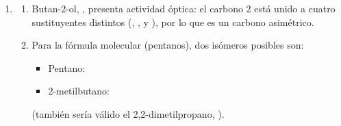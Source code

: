 \begin{exerciseEVAU}
\begin{solu}
\begin{enumerate}[label=\letraminuscula]
            \item
            \begin{enumerate}[label=\letraminuscula]
                \item Butan-2-ol, , presenta actividad óptica: el carbono 2 está unido a cuatro sustituyentes distintos (, ,  y ), por lo que es un carbono asimétrico.

                \item Para la fórmula molecular  (pentanos), dos isómeros posibles son:
                \begin{itemize}
                    \item Pentano: 
                    \item 2-metilbutano: 
                \end{itemize}
                (también sería válido el 2,2-dimetilpropano, ).
            \end{enumerate}
        \end{enumerate}
    \end{solu}
\end{exerciseEVAU}

